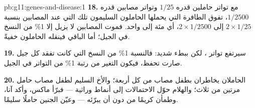 \begin{solution}{pb:g11:genes-and-disease:1}
\textbf{18.} مع تواتر حاملين قدره $1/25$ وتواتر مصابين قدره $1/2500$،
تفوق  الطافرة التي يحملها الحاملون السليمون تلك التي عند
المصابين بنسبة $2 \times 1/25$ إلى $2 \times
1/2500$، أي مئة إلى واحد. فموت المصابين لا يزيل إلا 1\% من النسخ في
الجيل؛ أما الباقي فينقله الحاملون خفيةً.

\textbf{19.} سيرتفع تواتر ، لكن ببطء شديد: فالنسبة 1\% من النسخ
التي كانت تفقد كل جيل صارت تحفظ، فيكون التغير من رتبة 1\% من التواتر
في الجيل.

\textbf{20.} الحاملان يخاطران بطفل مصاب من كل أربعة؛ والأخ السليم لطفل
مصاب حامل مرتين من ثلاث؛ والهلام حوّل الاحتمالات إلى أنماط وراثية ---
فبرّأ ماكس، وأكد آنا، وطمأن كريمًا من دون أن يبرّئه --- وعيّن الجنين
حاملًا سليمًا.
\end{solution}
